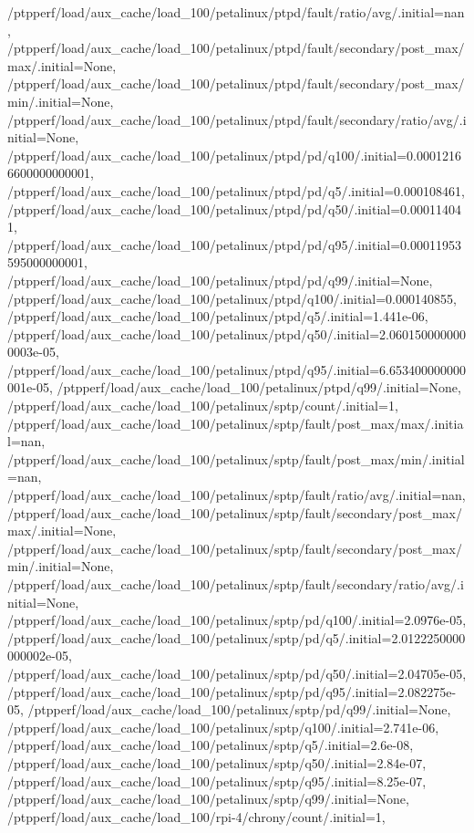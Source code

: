 {    /ptpperf/load/aux_cache/load_100/petalinux/ptpd/fault/ratio/avg/.initial=nan,
    /ptpperf/load/aux_cache/load_100/petalinux/ptpd/fault/secondary/post_max/max/.initial=None,
    /ptpperf/load/aux_cache/load_100/petalinux/ptpd/fault/secondary/post_max/min/.initial=None,
    /ptpperf/load/aux_cache/load_100/petalinux/ptpd/fault/secondary/ratio/avg/.initial=None,
    /ptpperf/load/aux_cache/load_100/petalinux/ptpd/pd/q100/.initial=0.00012166600000000001,
    /ptpperf/load/aux_cache/load_100/petalinux/ptpd/pd/q5/.initial=0.000108461,
    /ptpperf/load/aux_cache/load_100/petalinux/ptpd/pd/q50/.initial=0.000114041,
    /ptpperf/load/aux_cache/load_100/petalinux/ptpd/pd/q95/.initial=0.00011953595000000001,
    /ptpperf/load/aux_cache/load_100/petalinux/ptpd/pd/q99/.initial=None,
    /ptpperf/load/aux_cache/load_100/petalinux/ptpd/q100/.initial=0.000140855,
    /ptpperf/load/aux_cache/load_100/petalinux/ptpd/q5/.initial=1.441e-06,
    /ptpperf/load/aux_cache/load_100/petalinux/ptpd/q50/.initial=2.0601500000000003e-05,
    /ptpperf/load/aux_cache/load_100/petalinux/ptpd/q95/.initial=6.653400000000001e-05,
    /ptpperf/load/aux_cache/load_100/petalinux/ptpd/q99/.initial=None,
    /ptpperf/load/aux_cache/load_100/petalinux/sptp/count/.initial=1,
    /ptpperf/load/aux_cache/load_100/petalinux/sptp/fault/post_max/max/.initial=nan,
    /ptpperf/load/aux_cache/load_100/petalinux/sptp/fault/post_max/min/.initial=nan,
    /ptpperf/load/aux_cache/load_100/petalinux/sptp/fault/ratio/avg/.initial=nan,
    /ptpperf/load/aux_cache/load_100/petalinux/sptp/fault/secondary/post_max/max/.initial=None,
    /ptpperf/load/aux_cache/load_100/petalinux/sptp/fault/secondary/post_max/min/.initial=None,
    /ptpperf/load/aux_cache/load_100/petalinux/sptp/fault/secondary/ratio/avg/.initial=None,
    /ptpperf/load/aux_cache/load_100/petalinux/sptp/pd/q100/.initial=2.0976e-05,
    /ptpperf/load/aux_cache/load_100/petalinux/sptp/pd/q5/.initial=2.0122250000000002e-05,
    /ptpperf/load/aux_cache/load_100/petalinux/sptp/pd/q50/.initial=2.04705e-05,
    /ptpperf/load/aux_cache/load_100/petalinux/sptp/pd/q95/.initial=2.082275e-05,
    /ptpperf/load/aux_cache/load_100/petalinux/sptp/pd/q99/.initial=None,
    /ptpperf/load/aux_cache/load_100/petalinux/sptp/q100/.initial=2.741e-06,
    /ptpperf/load/aux_cache/load_100/petalinux/sptp/q5/.initial=2.6e-08,
    /ptpperf/load/aux_cache/load_100/petalinux/sptp/q50/.initial=2.84e-07,
    /ptpperf/load/aux_cache/load_100/petalinux/sptp/q95/.initial=8.25e-07,
    /ptpperf/load/aux_cache/load_100/petalinux/sptp/q99/.initial=None,
    /ptpperf/load/aux_cache/load_100/rpi-4/chrony/count/.initial=1,
}
